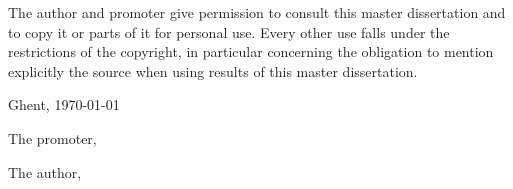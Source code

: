 

\par\vspace*{\fill}

The author and promoter give permission to consult this master dissertation and to copy it or parts of it for personal use. Every other use falls under the restrictions of the copyright, in particular concerning the obligation to mention explicitly the source when using results of this master dissertation.

\vspace{1cm}

Ghent, \today %

\vspace{1cm}

\begin{minipage}[t][4cm][t]{0.5\textwidth}
    \raggedright%
    The promoter,
    
    \vspace{2.5cm}
    
    \insertpromotor%
\end{minipage}
\begin{minipage}[t][4cm][t]{0.48\textwidth}
    \raggedright%
    The author,
    
    \vspace{2.5cm}
    
    \insertauthor%
\end{minipage}

\thispagestyle{empty}

